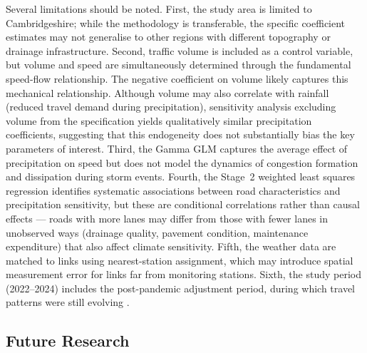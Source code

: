 \documentclass[review]{elsarticle}
\begin{document}
Several limitations should be noted. First, the study area is limited to Cambridgeshire; while the methodology is transferable, the specific coefficient estimates may not generalise to other regions with different topography or drainage infrastructure. Second, traffic volume is included as a control variable, but volume and speed are simultaneously determined through the fundamental speed-flow relationship. The negative coefficient on volume likely captures this mechanical relationship. Although volume may also correlate with rainfall (reduced travel demand during precipitation), sensitivity analysis excluding volume from the specification yields qualitatively similar precipitation coefficients, suggesting that this endogeneity does not substantially bias the key parameters of interest. Third, the Gamma GLM captures the average effect of precipitation on speed but does not model the dynamics of congestion formation and dissipation during storm events. Fourth, the Stage~2 weighted least squares regression identifies systematic associations between road characteristics and precipitation sensitivity, but these are conditional correlations rather than causal effects --- roads with more lanes may differ from those with fewer lanes in unobserved ways (drainage quality, pavement condition, maintenance expenditure) that also affect climate sensitivity. Fifth, the weather data are matched to links using nearest-station assignment, which may introduce spatial measurement error for links far from monitoring stations. Sixth, the study period (2022--2024) includes the post-pandemic adjustment period, during which travel patterns were still evolving \citep{wan2024paradox}.

\subsection{Future Research}
\label{sec:disc:future}
\end{document}

